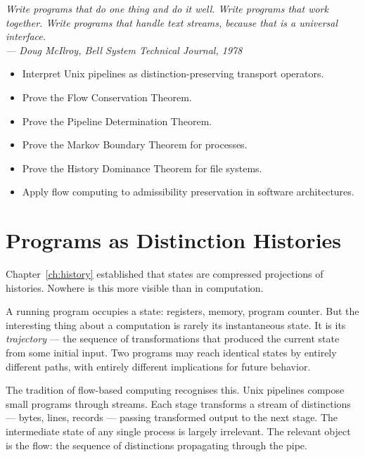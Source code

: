 \documentclass[12pt,twoside,openright]{book}
\newenvironment{epigraph}[2]{%
  \vspace{1em}\begin{flushright}
  \begin{minipage}{0.72\textwidth}
  \itshape\small #1\\[0.4em]
  \upshape\footnotesize\sffamily\color{DistGray}--- #2
  \end{minipage}\end{flushright}\vspace{1.5em}}{}
\newenvironment{objectives}{%
  \begin{tcolorbox}[colback=DistBlue!5,colframe=DistBlue,
    title={\faCheckCircle\enspace Learning Objectives},
    fonttitle=\sffamily\bfseries\color{white},
    attach boxed title to top left={yshift=-2mm,xshift=4mm},
    boxed title style={colback=DistBlue},breakable]
  \begin{itemize}[leftmargin=*,nosep]}{%
  \end{itemize}\end{tcolorbox}\vspace{1em}}
\begin{document}
\begin{epigraph}{%
  Write programs that do one thing and do it well.
  Write programs that work together.
  Write programs that handle text streams, because that is
  a universal interface.}%
  {Doug McIlroy, \textit{Bell System Technical Journal}, 1978}
\end{epigraph}

\begin{objectives}
  \item Interpret Unix pipelines as distinction-preserving
        transport operators.
  \item Prove the Flow Conservation Theorem.
  \item Prove the Pipeline Determination Theorem.
  \item Prove the Markov Boundary Theorem for processes.
  \item Prove the History Dominance Theorem for file systems.
  \item Apply flow computing to admissibility preservation
        in software architectures.
\end{objectives}

\section{Programs as Distinction Histories}

Chapter~\ref{ch:history} established that states are
compressed projections of histories. Nowhere is this
more visible than in computation.

A running program occupies a state: registers, memory,
program counter. But the interesting thing about a
computation is rarely its instantaneous state. It is its
\emph{trajectory} — the sequence of transformations that
produced the current state from some initial input. Two
programs may reach identical states by entirely different
paths, with entirely different implications for future
behavior.

The tradition of flow-based computing recognises this.
Unix pipelines compose small programs through streams.
Each stage transforms a stream of distinctions — bytes,
lines, records — passing transformed output to the next
stage. The intermediate state of any single process is
largely irrelevant. The relevant object is the flow: the
sequence of distinctions propagating through the pipe.
\end{document}
